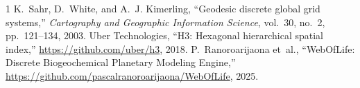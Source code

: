 \documentclass[10pt,journal,compsoc]{IEEEtran}
\begin{document}
\begin{thebibliography}{1}
K.~Sahr, D.~White, and A.~J. Kimerling, ``Geodesic discrete global grid systems,'' \emph{Cartography and Geographic Information Science}, vol.~30, no.~2, pp.~121--134, 2003.
Uber Technologies, ``H3: Hexagonal hierarchical spatial index,'' \url{https://github.com/uber/h3}, 2018.
P.~Ranoroarijaona et~al., ``WebOfLife: Discrete Biogeochemical Planetary Modeling Engine,'' \url{https://github.com/pascalranoroarijaona/WebOfLife}, 2025.
\end{thebibliography}
\end{document}
